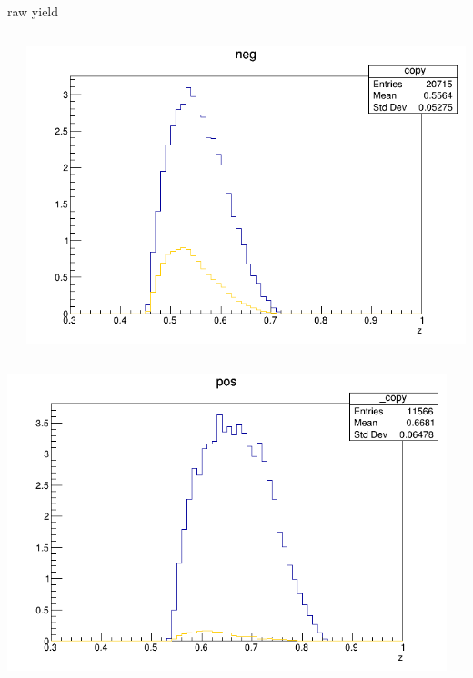 \begin{frame}{raw yield}
\begin{columns}
\begin{column}[T]{0.25\textwidth}
\end{column}
\begin{column}[T]{0.25\textwidth}
\includegraphics[width = \textwidth]{results/yield/statistics/yield_x_Q2_z_0.60_5.500_0.55_neg.png}
\end{column}
\end{columns}
\begin{columns}
\begin{column}[T]{0.25\textwidth}
\includegraphics[width = \textwidth]{results/yield/statistics/yield_x_Q2_z_0.60_5.500_0.65_pos.png}
\end{column}
\begin{column}[T]{0.25\textwidth}

\end{column}
\end{columns}
\end{frame}
